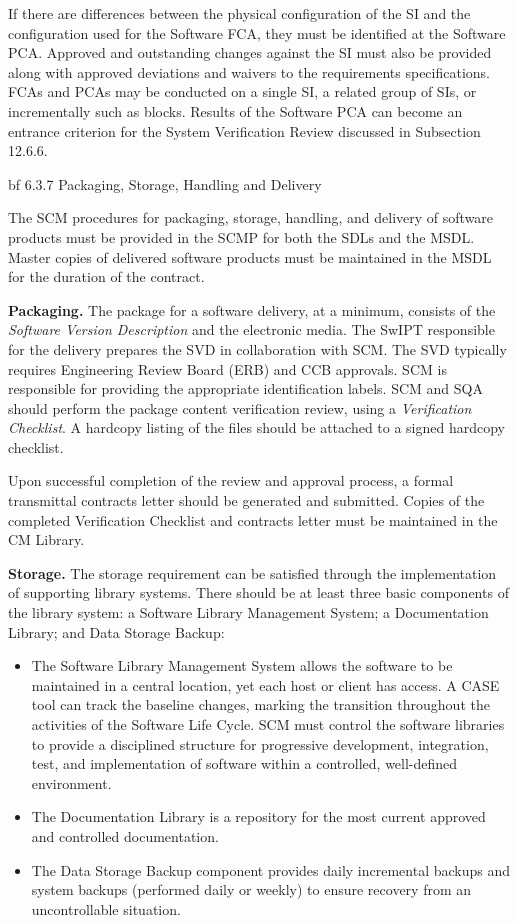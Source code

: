 \documentclass[8pt,twocolumn]{amsart}
\theoremstyle{plain}
\begin{document}
If there are differences between the physical configuration of the SI and the configuration used for the Software FCA, they must be identified at the Software PCA. Approved and outstanding changes against the SI must also be provided along with approved deviations and waivers to the requirements specifications. FCAs and PCAs may be conducted on a single SI, a related group of SIs, or incrementally such as blocks. Results of the Software PCA can become an entrance criterion for the System Verification Review discussed in Subsection 12.6.6.

{bf 6.3.7 Packaging, Storage, Handling and Delivery}

The SCM procedures for packaging, storage, handling, and delivery of software products must be provided in the SCMP for both the SDLs and the MSDL. Master copies of delivered software products must be maintained in the MSDL for the duration of the contract.

{\bf Packaging.} The package for a software delivery, at a minimum, consists of the {\em Software Version Description} and the electronic media. The SwIPT responsible for the delivery prepares the SVD in collaboration with SCM. The SVD typically requires Engineering Review Board (ERB) and CCB approvals. SCM is responsible for providing the appropriate identification labels. SCM and SQA should perform the package content verification review, using a {\em Verification Checklist}. A hardcopy listing of the files should be attached to a signed hardcopy checklist.

Upon successful completion of the review and approval process, a formal transmittal contracts letter should be generated and submitted. Copies of the completed Verification Checklist and contracts letter must be maintained in the CM Library. 

{\bf Storage.} The storage requirement can be satisfied through the implementation of supporting library systems. There should be at least three basic components of the library system: a Software Library Management System; a Documentation Library; and Data Storage Backup:
\begin{itemize}
\item The Software Library Management System allows the software to be maintained in a central location, yet each host or client has access. A CASE tool can track the baseline changes, marking the transition throughout the activities of the Software Life Cycle. SCM must control the software libraries to provide a disciplined structure for progressive development, integration, test, and implementation of software within a controlled, well-defined environment.
\item The Documentation Library is a repository for the most current approved and controlled documentation. 
\item The Data Storage Backup component provides daily incremental backups and system backups (performed daily or weekly) to ensure recovery from an uncontrollable situation.
\end{itemize}
\end{document}
